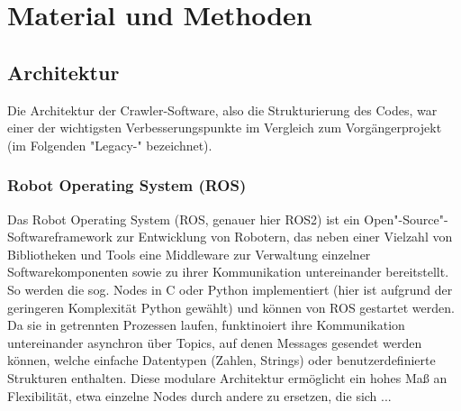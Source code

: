 \section{Material und Methoden}


\subsection{Architektur}

Die Architektur der Crawler-Software, also die Strukturierung des Codes, war einer der wichtigsten Verbesserungspunkte im Vergleich zum Vorgängerprojekt (im Folgenden "Legacy-" bezeichnet). 

\subsubsection{Robot Operating System (ROS)}

Das Robot Operating System (ROS, genauer hier ROS2)\cite{ros} ist ein Open"-Source"-Softwareframework zur Entwicklung von Robotern, das neben einer Vielzahl von Bibliotheken und Tools eine Middleware zur Verwaltung einzelner Softwarekomponenten sowie zu ihrer Kommunikation untereinander bereitstellt. So werden die sog. Nodes in C oder Python implementiert (hier ist aufgrund der geringeren Komplexität Python gewählt) und können von ROS gestartet werden. Da sie in getrennten Prozessen laufen, funktinoiert ihre Kommunikation untereinander asynchron über Topics, auf denen Messages gesendet werden können, welche einfache Datentypen (Zahlen, Strings) oder benutzerdefinierte Strukturen enthalten. Diese modulare Architektur ermöglicht ein hohes Maß an Flexibilität, etwa einzelne Nodes durch andere zu ersetzen, die sich ...